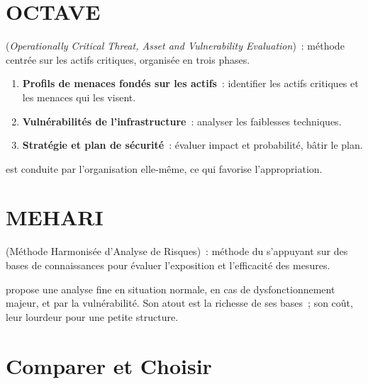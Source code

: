 \section{OCTAVE}
\label{sec:c12-octave}

\begin{boxdef}
 (\emph{Operationally Critical Threat, Asset and
Vulnerability Evaluation})~: méthode centrée sur les actifs critiques,
organisée en trois phases.
\end{boxdef}

\begin{enumerate}
    \item \textbf{Profils de menaces fondés sur les actifs}~: identifier les
          actifs critiques et les menaces qui les visent.
    \item \textbf{Vulnérabilités de l'infrastructure}~: analyser les
          faiblesses techniques.
    \item \textbf{Stratégie et plan de sécurité}~: évaluer impact et
          probabilité, bâtir le plan.
\end{enumerate}

 est conduite par l'organisation elle-même, ce qui favorise
l'appropriation.

\section{MEHARI}
\label{sec:c12-mehari}

\begin{boxdef}
 (Méthode Harmonisée d'Analyse de Risques)~: méthode
du  s'appuyant sur des bases de connaissances pour évaluer
l'exposition et l'efficacité des mesures.
\end{boxdef}

 propose une analyse fine en situation normale, en cas de
dysfonctionnement majeur, et par la vulnérabilité. Son atout est la richesse de
ses bases~; son coût, leur lourdeur pour une petite structure.

\section{Comparer et Choisir}
\label{sec:c12-choisir}

